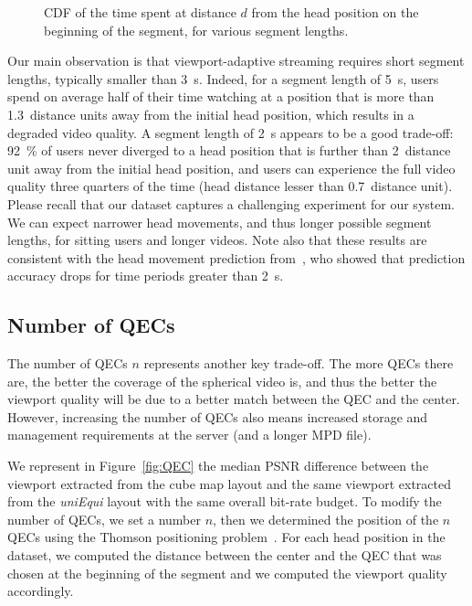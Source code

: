 \begin{figure}
\centering

\caption{CDF of the time spent at distance $d$ from the head position on the beginning of the
segment, for various segment lengths.}\label{cdf-dataset}
\end{figure}

Our main observation is that viewport-adaptive streaming requires
short segment lengths, typically smaller than \SI{3}{\second}. Indeed,
for a segment length of \SI{5}{\second}, users spend on average half of
their time watching at a position that is more than
\num{1.3}~distance units away from the initial head position, which
results in a degraded video quality. A segment length of
\SI{2}{\second} appears to be a good trade-off: \SI{92}{\percent} of
users never diverged to a head position that is further than
\num{2}~distance unit away from the initial head position, and users
can experience the full video quality three quarters of the time (head distance
lesser than \num{0.7}~distance unit). Please recall that our dataset
captures a challenging experiment for our system. We can expect
narrower head movements, and thus longer possible segment lengths, for
sitting users and longer videos. Note also that these results are consistent
with the head movement prediction from~\citet{allthings}, who showed that 
prediction accuracy drops for time periods greater than \SI{2}{\second}.

\subsection{Number of \acp{QEC}}

The number of \acp{QEC} $n$ represents another key trade-off. The more
\acp{QEC} there are, the better the coverage of the spherical video
is, and thus the better the viewport quality will be due to a better
match between the \ac{QEC} and the \FoV{} center. However,
increasing the number of \acp{QEC} also means increased storage and
management requirements at the server (and a longer \ac{MPD} file).


We represent in Figure~\ref{fig:QEC} the median \ac{PSNR} difference
between the viewport extracted from the cube map layout and the
same viewport extracted from the \emph{uniEqui} layout with the same
overall bit-rate budget. To modify the number of \acp{QEC}, we set a
number $n$, then we determined the position of the $n$ \acp{QEC}
using the Thomson positioning problem~\cite{rakhmanov1994electrons}.
For each head position in the dataset, we computed the distance
between the \FoV{} center and the \ac{QEC} that was chosen at the
beginning of the segment and we computed the viewport quality
accordingly.


